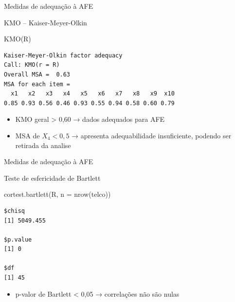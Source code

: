 \documentclass[
  ignorenonframetext,
  aspectratio=169,
]{beamer}
\newenvironment{Shaded}{\begin{snugshade}}{\end{snugshade}}
\newcommand{\AttributeTok}[1]{\textcolor[rgb]{0.40,0.45,0.13}{#1}}
\newcommand{\FunctionTok}[1]{\textcolor[rgb]{0.28,0.35,0.67}{#1}}
\newcommand{\NormalTok}[1]{\textcolor[rgb]{0.00,0.23,0.31}{#1}}
\providecommand{\tightlist}{%
  \setlength{\itemsep}{0pt}\setlength{\parskip}{0pt}}
\begin{document}
\begin{frame}[fragile]{Medidas de adequação à AFE}
\label{medidas-de-adequauxe7uxe3o-uxe0-afe}
\begin{block}{KMO -- Kaiser-Meyer-Olkin}
\label{kmo-kaiser-meyer-olkin}
\begin{Shaded}
\begin{Highlighting}[]
\FunctionTok{KMO}\NormalTok{(R)}
\end{Highlighting}
\end{Shaded}

\begin{verbatim}
Kaiser-Meyer-Olkin factor adequacy
Call: KMO(r = R)
Overall MSA =  0.63
MSA for each item = 
  x1   x2   x3   x4   x5   x6   x7   x8   x9  x10 
0.85 0.93 0.56 0.46 0.93 0.55 0.94 0.58 0.60 0.79 
\end{verbatim}

\begin{itemize}
\tightlist
\item
  KMO geral \textgreater{} 0,60 → dados adequados para AFE
\item
  MSA de \(X_4 < 0,5\) → apresenta adequabilidade insuficiente, podendo
  ser retirada da analise
\end{itemize}
\end{block}
\end{frame}

\begin{frame}[fragile]{Medidas de adequação à AFE}
\label{medidas-de-adequauxe7uxe3o-uxe0-afe-1}
\begin{block}{Teste de esfericidade de Bartlett}
\label{teste-de-esfericidade-de-bartlett}
\begin{Shaded}
\begin{Highlighting}[]
\FunctionTok{cortest.bartlett}\NormalTok{(R, }\AttributeTok{n =} \FunctionTok{nrow}\NormalTok{(telco))}
\end{Highlighting}
\end{Shaded}

\begin{verbatim}
$chisq
[1] 5049.455

$p.value
[1] 0

$df
[1] 45
\end{verbatim}

\begin{itemize}
\tightlist
\item
  p-valor de Bartlett \textless{} 0,05 → correlações não são nulas
\end{itemize}
\end{block}
\end{frame}
\end{document}
